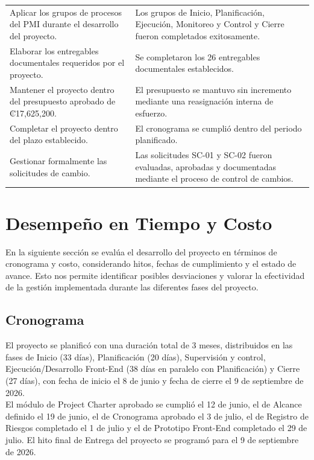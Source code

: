 \documentclass[11pt,spanish]{article}
\begin{document}
\begin{table}[H]
{\begin{tabularx}{\textwidth}{p{6cm}Y}
Aplicar los grupos de procesos del PMI durante el desarrollo del proyecto.
&
Los grupos de Inicio, Planificación, Ejecución, Monitoreo y Control y Cierre fueron completados exitosamente.
\\

Elaborar los entregables documentales requeridos por el proyecto.
&
Se completaron los 26 entregables documentales establecidos.
\\

Mantener el proyecto dentro del presupuesto aprobado de ₡17,625,200.
&
El presupuesto se mantuvo sin incremento mediante una reasignación interna de esfuerzo.
\\

Completar el proyecto dentro del plazo establecido.
&
El cronograma se cumplió dentro del periodo planificado.
\\

Gestionar formalmente las solicitudes de cambio.
&
Las solicitudes SC-01 y SC-02 fueron evaluadas, aprobadas y documentadas mediante el proceso de control de cambios.
\\

\bottomrule
\end{tabularx}
}
\end{table}

\section{Desempeño en Tiempo y Costo}

En la siguiente sección se evalúa el desarrollo del proyecto en términos de cronograma y costo, considerando hitos, fechas de cumplimiento y el estado de avance. Esto nos permite identificar posibles desviaciones y valorar la efectividad de la gestión implementada durante las diferentes fases del proyecto.

\subsection{Cronograma}

El proyecto se planificó con una duración total de 3 meses, distribuidos en las fases de Inicio (33 días), Planificación (20 días), Supervisión y control, Ejecución/Desarrollo Front-End (38 días en paralelo con Planificación) y Cierre (27 días), con fecha de inicio el 8 de junio y fecha de cierre el 9 de septiembre de 2026.\\
El módulo de Project Charter aprobado se cumplió el 12 de junio, el de Alcance definido el 19 de junio, el de Cronograma aprobado el 3 de julio, el de Registro de Riesgos completado el 1 de julio y el de Prototipo Front-End completado el 29 de julio. El hito final de Entrega del proyecto se programó para el 9 de septiembre de 2026.
\end{document}
